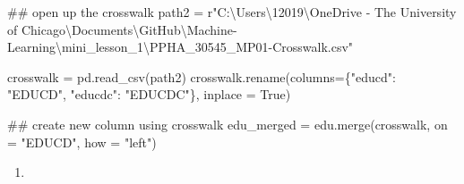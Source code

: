 \documentclass[
  letterpaper,
  DIV=11,
  numbers=noendperiod]{scrartcl}
\newenvironment{Shaded}{\begin{snugshade}}{\end{snugshade}}
\newcommand{\CommentTok}[1]{\textcolor[rgb]{0.37,0.37,0.37}{#1}}
\newcommand{\NormalTok}[1]{\textcolor[rgb]{0.00,0.23,0.31}{#1}}
\newcommand{\OperatorTok}[1]{\textcolor[rgb]{0.37,0.37,0.37}{#1}}
\newcommand{\StringTok}[1]{\textcolor[rgb]{0.13,0.47,0.30}{#1}}
\newcommand{\VariableTok}[1]{\textcolor[rgb]{0.07,0.07,0.07}{#1}}
\newcommand{\VerbatimStringTok}[1]{\textcolor[rgb]{0.13,0.47,0.30}{#1}}
\providecommand{\tightlist}{%
  \setlength{\itemsep}{0pt}\setlength{\parskip}{0pt}}\usepackage{longtable,booktabs,array}
\begin{document}
\begin{Shaded}
\begin{Highlighting}[]
\CommentTok{\#\# open up the crosswalk }
\NormalTok{path2 }\OperatorTok{=} \VerbatimStringTok{r"C:\textbackslash{}Users\textbackslash{}12019\textbackslash{}OneDrive {-} The University of Chicago\textbackslash{}Documents\textbackslash{}GitHub\textbackslash{}Machine{-}Learning\textbackslash{}mini\_lesson\_1\textbackslash{}PPHA\_30545\_MP01{-}Crosswalk.csv"}

\NormalTok{crosswalk }\OperatorTok{=}\NormalTok{ pd.read\_csv(path2)}
\NormalTok{crosswalk.rename(columns}\OperatorTok{=}\NormalTok{\{}\StringTok{"educd"}\NormalTok{: }\StringTok{"EDUCD"}\NormalTok{, }\StringTok{"educdc"}\NormalTok{: }\StringTok{"EDUCDC"}\NormalTok{\}, inplace }\OperatorTok{=} \VariableTok{True}\NormalTok{)}

\CommentTok{\#\# create new column using crosswalk }
\NormalTok{edu\_merged }\OperatorTok{=}\NormalTok{ edu.merge(crosswalk, on }\OperatorTok{=} \StringTok{"EDUCD"}\NormalTok{, how }\OperatorTok{=} \StringTok{"left"}\NormalTok{)}
\end{Highlighting}
\end{Shaded}

\begin{enumerate}
\def\labelenumi{\alph{enumi}.}
\setcounter{enumi}{1}
\tightlist
\item
\end{enumerate}
\end{document}
